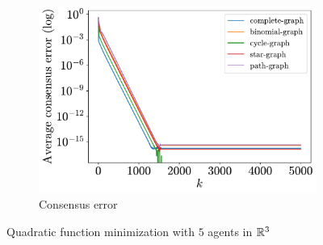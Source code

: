 \documentclass[a4paper,11pt,oneside]{book}
\begin{document}
\begin{figure}[tb!]
\begin{subfigure}[t]{0.46\linewidth}
            \includegraphics[width=\linewidth]{./figs/quadratic/5_3/consensus.pdf} 
            \caption{Consensus error}
      \end{subfigure}
      \caption{Quadratic function minimization with $5$ agents in ${\mathbb{R}}^{3}$}
      \label{fig:quadratic_5_3}
\end{figure}
\end{document}
